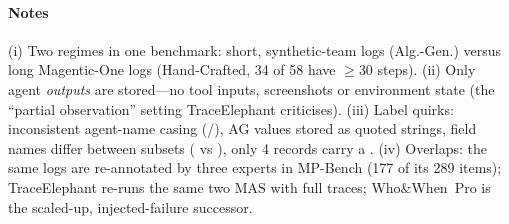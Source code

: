 \paragraph{Notes} (i) Two regimes in one benchmark: short, synthetic-team logs (Alg.-Gen.) versus long Magentic-One logs (Hand-Crafted, 34 of 58 have $\ge$30 steps). (ii) Only agent \emph{outputs} are stored---no tool inputs, screenshots or environment state (the ``partial observation'' setting TraceElephant criticises). (iii) Label quirks: inconsistent agent-name casing (/), AG values stored as quoted strings, field names differ between subsets ( vs ), only 4 records carry a . (iv) Overlaps: the same logs are re-annotated by three experts in MP-Bench (177 of its 289 items); TraceElephant re-runs the same two MAS with full traces; Who\&When~Pro is the scaled-up, injected-failure successor.
